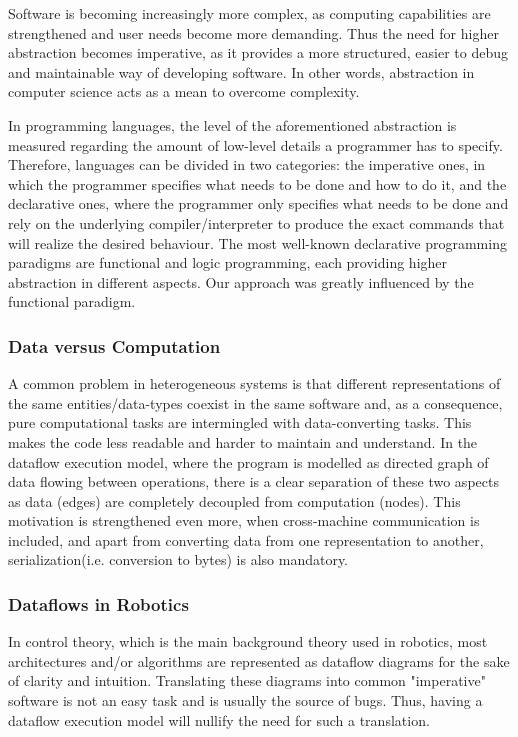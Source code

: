 \documentclass[sigplan,review,anonymous]{acmart}
\begin{document}
Software is becoming increasingly more complex, as computing capabilities are
strengthened and user needs become more demanding. Thus the need for higher
abstraction becomes imperative, as it provides a more structured, easier to
debug and maintainable way of developing software. In other words, abstraction
in computer science acts as a mean to overcome complexity.

In programming languages, the level of the aforementioned abstraction is
measured regarding the amount of low-level details a programmer has to specify.
Therefore, languages can be divided in two categories: the imperative ones, in
which the programmer specifies what needs to be done and how to do it, and the
declarative ones, where the programmer only specifies what needs to be done and
rely on the underlying compiler/interpreter to produce the exact commands that
will realize the desired behaviour. The most well-known declarative programming
paradigms are functional and logic programming, each providing higher
abstraction in different aspects. Our approach was greatly influenced by the
functional paradigm.

\subsubsection{Data versus Computation}

A common problem in heterogeneous systems is that different representations of
the same entities/data-types coexist in the same software and, as a consequence,
pure computational tasks are intermingled with data-converting tasks. This makes
the code less readable and harder to maintain and understand. In the dataflow
execution model, where the program is modelled as directed graph of data flowing
between operations, there is a clear separation of these two aspects as data
(edges) are completely decoupled from computation (nodes). This motivation is
strengthened even more, when cross-machine communication is included, and apart
from converting data from one representation to another, serialization(i.e.
conversion to bytes) is also mandatory.

\subsubsection{Dataflows in Robotics}

In control theory, which is the main background theory used in robotics, most
architectures and/or algorithms are represented as dataflow diagrams for the
sake of clarity and intuition. Translating these diagrams into common
"imperative" software is not an easy task and is usually the source of bugs.
Thus, having a dataflow execution model will nullify the need for such a
translation.
\end{document}

